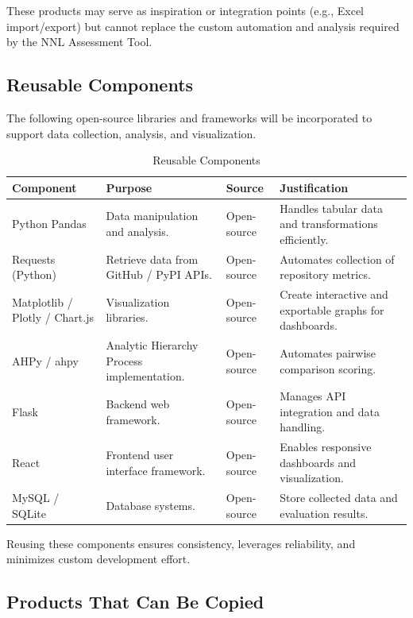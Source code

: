 \documentclass[12pt]{article}
\begin{document}
These products may serve as inspiration or integration points (e.g., Excel import/export) but cannot replace the custom automation and analysis required by the NNL Assessment Tool.

\subsection{Reusable Components}

The following open-source libraries and frameworks will be incorporated to support data collection, analysis, and visualization.

\begin{table}[hp]
\caption{Reusable Components}
\begin{tabularx}{\textwidth}{p{2.8cm}X X X}
\toprule
\textbf{Component} & \textbf{Purpose} & \textbf{Source} & \textbf{Justification} \\
\midrule
Python Pandas & Data manipulation and analysis. & Open-source & Handles tabular data and transformations efficiently. \\
\addlinespace[0.3em]
Requests (Python) & Retrieve data from GitHub / PyPI APIs. & Open-source & Automates collection of repository metrics. \\
\addlinespace[0.3em]
Matplotlib / Plotly / Chart.js & Visualization libraries. & Open-source & Create interactive and exportable graphs for dashboards. \\
\addlinespace[0.3em]
AHPy / ahpy & Analytic Hierarchy Process implementation. & Open-source & Automates pairwise comparison scoring. \\
\addlinespace[0.3em]
Flask & Backend web framework. & Open-source & Manages API integration and data handling. \\
\addlinespace[0.3em]
React & Frontend user interface framework. & Open-source & Enables responsive dashboards and visualization. \\
\addlinespace[0.3em]
MySQL / SQLite & Database systems. & Open-source & Store collected data and evaluation results. \\
\bottomrule
\end{tabularx}
\end{table}

Reusing these components ensures consistency, leverages reliability, and minimizes custom development effort.

\subsection{Products That Can Be Copied}
\end{document}
